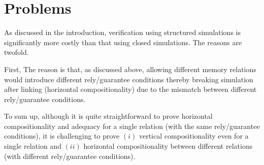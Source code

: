 \section{Problems}
\label{sec:rusc:problems}

As discussed in the introduction, verification using structured
simulations is significantly more costly than that using closed
simulations.  The reasons are twofold.

First, 
%
The reason is that, as discussed above,
allowing different memory relations would introduce
different rely/guarantee conditions
thereby breaking simulation after linking (\ie horizontal
compositionality) due to the mismatch between different rely/guarantee
conditions.


To sum up, although it is quite straightforward to prove horizontal
compositionality and adequacy for a single relation (\ie with the same
rely/guarantee conditions), it is challenging to prove $(i)$ vertical
compositionality even for a single relation and $(ii)$ horizontal
compositionality between different relations (\ie with different
rely/guarantee conditions).

